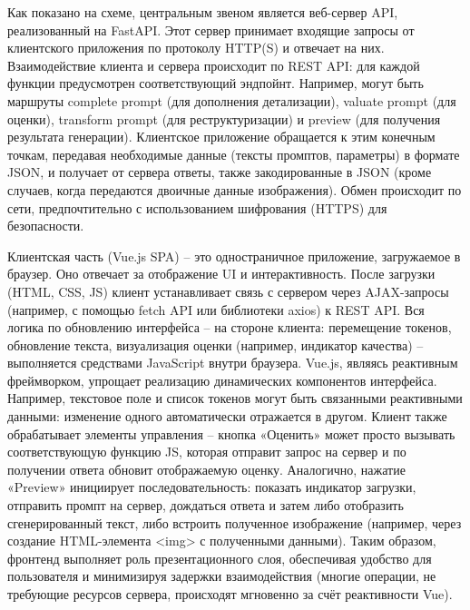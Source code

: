 Как показано на схеме, центральным звеном является веб-сервер API, реализованный на FastAPI. Этот сервер принимает входящие запросы от клиентского приложения по протоколу HTTP(S) и отвечает на них. Взаимодействие клиента и сервера происходит по REST API: для каждой функции предусмотрен соответствующий эндпойнт. Например, могут быть маршруты complete prompt (для дополнения детализации), valuate prompt (для оценки), transform prompt (для реструктуризации) и preview (для получения результата генерации). Клиентское приложение обращается к этим конечным точкам, передавая необходимые данные (тексты промптов, параметры) в формате JSON, и получает от сервера ответы, также закодированные в JSON (кроме случаев, когда передаются двоичные данные изображения). Обмен происходит по сети, предпочтительно с использованием шифрования (HTTPS) для безопасности.

Клиентская часть (Vue.js SPA) – это одностраничное приложение, загружаемое в браузер. Оно отвечает за отображение UI и интерактивность. После загрузки (HTML, CSS, JS) клиент устанавливает связь с сервером через AJAX-запросы (например, с помощью fetch API или библиотеки axios) к REST API. Вся логика по обновлению интерфейса – на стороне клиента: перемещение токенов, обновление текста, визуализация оценки (например, индикатор качества) – выполняется средствами JavaScript внутри браузера. Vue.js, являясь реактивным фреймворком, упрощает реализацию динамических компонентов интерфейса\cite{vuejs:wiki}. Например, текстовое поле и список токенов могут быть связанными реактивными данными: изменение одного автоматически отражается в другом. Клиент также обрабатывает элементы управления – кнопка «Оценить» может просто вызывать соответствующую функцию JS, которая отправит запрос на сервер и по получении ответа обновит отображаемую оценку. Аналогично, нажатие «Preview» инициирует последовательность: показать индикатор загрузки, отправить промпт на сервер, дождаться ответа и затем либо отобразить сгенерированный текст, либо встроить полученное изображение (например, через создание HTML-элемента <img> с полученными данными). Таким образом, фронтенд выполняет роль презентационного слоя, обеспечивая удобство для пользователя и минимизируя задержки взаимодействия (многие операции, не требующие ресурсов сервера, происходят мгновенно за счёт реактивности Vue).


